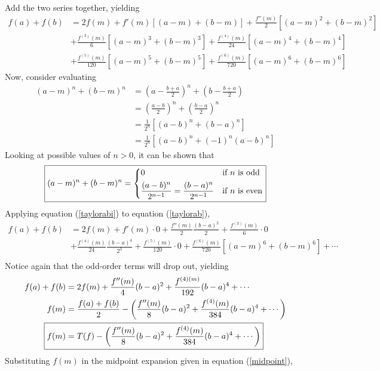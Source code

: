 Add the two series together, yielding
\begin{align}\label{taylorab}
f(a) + f(b) &= 2f(m) + f'(m)\left[(a-m)+(b-m)\right] + \frac{f''(m)}{2}\left[(a-m)^2+(b-m)^2\right] \\
&+ \frac{f^{(3)}(m)}{6}\left[(a-m)^3+(b-m)^3\right] + \frac{f^{(4)}(m)}{24}\left[(a-m)^4+(b-m)^4\right] \\
&+ \frac{f^{(5)}(m)}{120}\left[(a-m)^5+(b-m)^5\right] + \frac{f^{(6)}(m)}{720}\left[(a-m)^6+(b-m)^6\right]
\end{align}
Now, consider evaluating
\begin{align*}
(a-m)^n + (b-m)^n &= \left(a-\frac{b+a}{2}\right)^n + \left(b-\frac{b+a}{2}\right) \\
&= \left(\frac{a-b}{2}\right)^n + \left(\frac{b-a}{2}\right)^n\\
&= \frac{1}{2^n}\left[(a-b)^n+(b-a)^n\right]\\
&= \frac{1}{2^n}\left[(a-b)^n+(-1)^n(a-b)^n\right]
\end{align*}
Looking at possible values of $n>0$, it can be shown that
\begin{equation}\label{taylorabi}
\boxed{
	(a-m)^n + (b-m)^n =
	\begin{dcases}
	0 & \text{if } n \text{ is odd}\\
	\frac{(a-b)^n}{2^{n-1}} = \frac{(b-a)^n}{2^{n-1}} &\text{if } n \text{ is even}
	\end{dcases}
}
\end{equation}
Applying equation (\ref{taylorabi}) to equation (\ref{taylorab}),
\begin{align*}
f(a) + f(b) &= 2f(m) + f'(m)\cdot 0 + \frac{f''(m)}{2}\frac{(b-a)^2}{2} + \frac{f^{(3)}(m)}{6}\cdot 0\\
&+ \frac{f^{(4)}(m)}{24}\frac{(b-a)^4}{2^3} + \frac{f^{(5)}(m)}{120}\cdot 0 + \frac{f^{(6)}(m)}{720}\left[(a-m)^6+(b-m)^6\right] + \cdots \\
\end{align*}
Notice again that the odd-order terms will drop out, yielding
\begin{align*}
f(a) + f(b) &= 2f(m) + \frac{f''(m)}{4}(b-a)^2 + \frac{f^{(4)(m)}}{192}(b-a)^4 + \cdots\\
f(m) &= \frac{f(a)+f(b)}{2} - \left(\frac{f''(m)}{8}(b-a)^2 + \frac{f^{(4)}(m)}{384}(b-a)^4 + \cdots \right)\\
\Aboxed{f(m) &= T(f) - \left(\frac{f''(m)}{8}(b-a)^2 + \frac{f^{(4)}(m)}{384}(b-a)^4 + \cdots \right)}
\end{align*}
Substituting $f(m)$ in the midpoint expansion given in equation (\ref{midpoint}),
